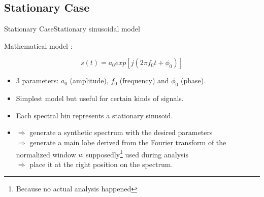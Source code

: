\documentclass{bredelebeamer}
\begin{document}
\subsection{Stationary Case}
\begin{frame}{Stationary Case}{Stationary sinusoidal model}
\begin{block}{Mathematical model  :}

\begin{equation}
s(t) = a_0 exp[j(2 \pi f_0 t + \phi_0)]
\end{equation}
\end{block}
\begin{itemize}
\item 3 parameters: $a_0$ (amplitude), $f_0$ (frequency) and $\phi_0$ (phase).
\item Simplest model but useful for certain kinds of signals.
\item Each spectral bin represents a stationary sinusoid.
\item $\Rightarrow$ generate a synthetic spectrum with the desired parameters\\ $\Rightarrow$ generate a main lobe derived from the Fourier transform of the normalized window $w$ supposedly\footnote{Because no actual analysis happened} used during analysis \\ $\Rightarrow$ place it at the right position on the spectrum.
\end{itemize}

\end{frame}
\end{document}
